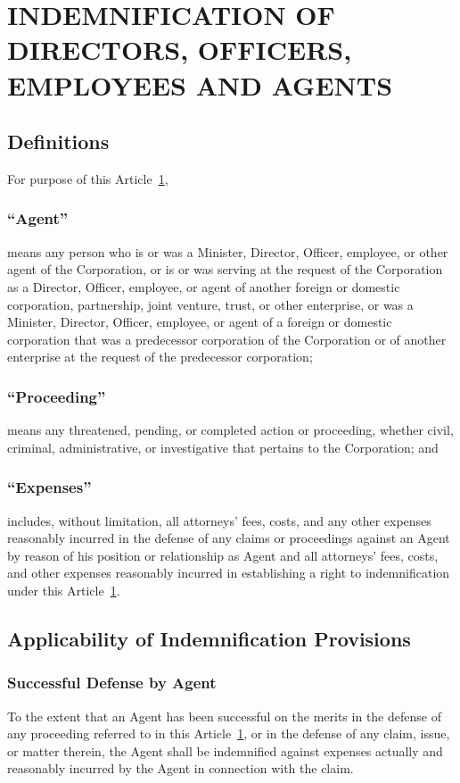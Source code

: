 \documentclass[letterpaper,titlepage]{article}
\begin{document}
\section{INDEMNIFICATION OF DIRECTORS, OFFICERS, EMPLOYEES AND AGENTS}
\label{sec:indemnificationDirectors}
\subsection{Definitions}
For purpose of this Article~\ref{sec:indemnificationDirectors},
\subsubsection{``Agent''}
\label{sec:agent}
means any person who is or was a Minister, Director, Officer, employee, or
other agent of the Corporation, or is or was serving at the request of the
Corporation as a Director, Officer, employee, or agent of another foreign or
domestic corporation, partnership, joint venture, trust, or other enterprise,
or was a Minister, Director, Officer, employee, or agent of a foreign or
domestic corporation that was a predecessor corporation of the Corporation or
of another enterprise at the request of the predecessor corporation;
\subsubsection{``Proceeding''}
\label{sec:proceeding}
means any threatened, pending, or completed action or proceeding, whether
civil, criminal, administrative, or investigative that pertains to the
Corporation; and
\subsubsection{``Expenses''}
\label{sec:expenses}
includes, without limitation, all attorneys' fees, costs, and any other
expenses reasonably incurred in the defense of any claims or proceedings
against an Agent by reason of his position or relationship as Agent and all
attorneys' fees, costs, and other expenses reasonably incurred in establishing
a right to indemnification under this
Article~\ref{sec:indemnificationDirectors}.
\subsection{Applicability of Indemnification Provisions}
\label{sec:applicability}
\subsubsection{Successful Defense by Agent}
\label{sec:successfulDefense}
To the extent that an Agent has been successful on the merits in the defense of
any proceeding referred to in this Article~\ref{sec:indemnificationDirectors},
or in the defense of any claim, issue, or matter therein, the Agent shall be
indemnified against expenses actually and reasonably incurred by the Agent in
connection with the claim.
\end{document}
